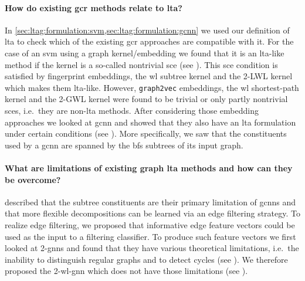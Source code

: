 \paragraph{\; How do existing \ac{gcr} methods relate to \ac{lta}?}
In \cref{sec:ltag:formulation:svm,sec:ltag:formulation:gcnn} we used our definition of \ac{lta} to check which of the existing \ac{gcr} approaches are compatible with it.
For the case of an \ac{svm} using a graph kernel/embedding we found that it is an \acs{lta}-like method if the kernel is a so-called nontrivial \acf{sce} (see ).
This \ac{sce} condition is satisfied by fingerprint embeddings, the \ac{wl} subtree kernel and the 2-LWL kernel which makes them \acs{lta}-like.
However, \texttt{graph2vec} embeddings, the \ac{wl} shortest-path kernel and the 2-GWL kernel were found to be trivial or only partly nontrivial \acp{sce}, i.e.\ they are non-\acs{lta} methods.
After considering those embedding approaches we looked at \ac{gcnn} and showed that they also have an \ac{lta} formulation under certain conditions (see ).
More specifically, we saw that the constituents used by a \ac{gcnn} are spanned by the \ac{bfs} subtrees of its input graph.

\paragraph{\; What are limitations of existing graph \ac{lta} methods and how can they be overcome?}
 described that the subtree constituents are their primary limitation of \acp{gcnn} and that more flexible decompositions can be learned via an edge filtering strategy.
To realize edge filtering, we proposed that informative edge feature vectors could be used as the input to a filtering classifier.
To produce such feature vectors we first looked at 2-\acsp{gnn} and found that they have various theoretical limitations, i.e.\ the inability to distinguish regular graphs and to detect cycles (see ).
We therefore proposed the 2-\acs{wl}-\acs{gnn} which does not have those limitations (see ).

